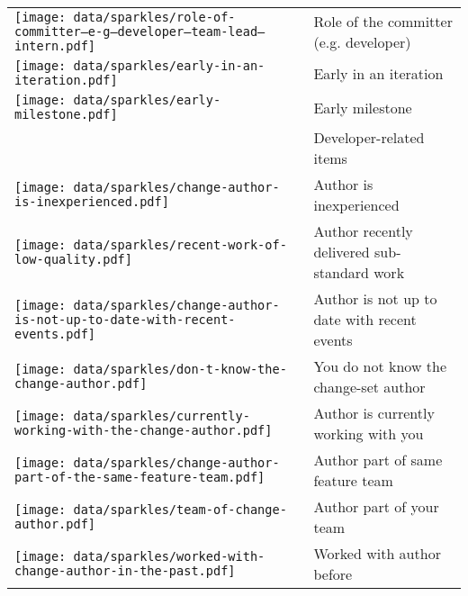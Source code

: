 \begin{table}[t!]
\begin{tabular}{ll}
\vspace{-2pt}\texttt{[image: data/sparkles/role-of-committer--e-g--developer--team-lead--intern.pdf]} & Role of the committer (e.g. developer)\\
\vspace{-2pt}\texttt{[image: data/sparkles/early-in-an-iteration.pdf]} & Early in an iteration\\
\vspace{-2pt}\texttt{[image: data/sparkles/early-milestone.pdf]} & Early milestone\\
\midrule
\vspace{-2pt}& Developer-related items\\
\midrule
\vspace{-2pt}\texttt{[image: data/sparkles/change-author-is-inexperienced.pdf]} & Author is inexperienced\\
\vspace{-2pt}\texttt{[image: data/sparkles/recent-work-of-low-quality.pdf]} & Author recently delivered sub-standard work\\
\vspace{-2pt}\texttt{[image: data/sparkles/change-author-is-not-up-to-date-with-recent-events.pdf]} & Author is not up to date with recent events\\
\vspace{-2pt}\texttt{[image: data/sparkles/don-t-know-the-change-author.pdf]} & You do not know the change-set author \\
\vspace{-2pt}\texttt{[image: data/sparkles/currently-working-with-the-change-author.pdf]} & Author is currently working with you\\
\vspace{-2pt}\texttt{[image: data/sparkles/change-author-part-of-the-same-feature-team.pdf]} & Author part of same feature team\\
\vspace{-2pt}\texttt{[image: data/sparkles/team-of-change-author.pdf]} & Author part of your team\\
\vspace{-2pt}\texttt{[image: data/sparkles/worked-with-change-author-in-the-past.pdf]} & Worked with author before\\

\end{tabular}
\end{table}
